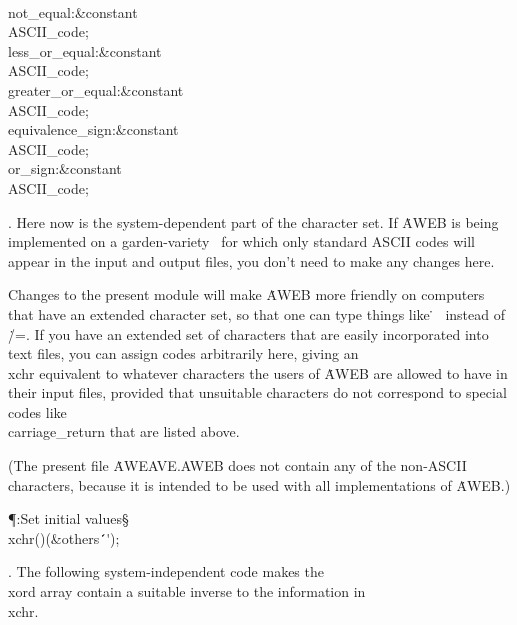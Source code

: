 \\{not\_equal}\?:\?\&{constant}\8\\{ASCII\_code}\?\K{}\?;\6
\\{less\_or\_equal}\?:\?\&{constant}\8\\{ASCII\_code}\?\K{}\?;%
\6
\\{greater\_or\_equal}\?:\?\&{constant}\8\\{ASCII\_code}\?\K{}\?;%
\6
\\{equivalence\_sign}\?:\?\&{constant}\8\\{ASCII\_code}\?\K{}\?;%
\6
\\{or\_sign}\?:\?\&{constant}\8\\{ASCII\_code}\?\K{}\?;\par
\fi

. Here now is the system-dependent part of the character set.
If \.{AWEB} is being implemented on a garden-variety \ADA\ for which
only standard ASCII codes will appear in the input and output files, you
don't need to make any changes here.

Changes to the present module will make \.{AWEB} more friendly on computers
that have an extended character set, so that one can type things like
\.^^Z\ instead of \.{/=}. If you have an extended set of characters that
are easily incorporated into text files, you can assign codes arbitrarily
here, giving an \\{xchr} equivalent to whatever characters the users of
\.{AWEB} are allowed to have in their input files, provided that unsuitable
characters do not correspond to special codes like \\{carriage\_return}
that are listed above.

(The present file \.{AWEAVE.AWEB} does not contain any of the non-ASCII
characters, because it is intended to be used with all implementations of
\.{AWEB}.)

\Y\P\?\4:Set initial values\X\mathrel{+}\S\?\6
\\{xchr}\?\1(\?\to{}\2)\K\1(\?\&{others}\?\8\KR\?\.{\'\ \'}\?\2)\?;%
\par
\fi

. The following system-independent code makes the \\{xord} array contain a
suitable inverse to the information in \\{xchr}.

